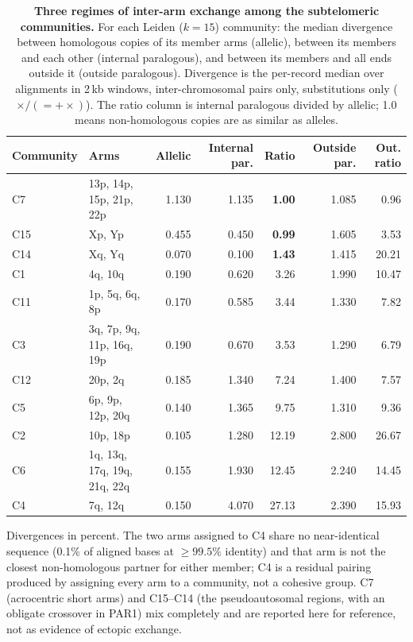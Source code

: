 
\begin{table}[h!]
\centering
\caption{\textbf{Three regimes of inter-arm exchange among the subtelomeric
communities.} For each Leiden ($k=15$) community: the median divergence between
homologous copies of its member arms (allelic), between its members and each
other (internal paralogous), and between its members and all ends outside it
(outside paralogous). Divergence is the per-record median over alignments in
2\,kb windows, inter-chromosomal pairs only, substitutions only
($\times/({=}+\times)$). The ratio column is internal paralogous divided by
allelic; 1.0 means non-homologous copies are as similar as alleles.}
\label{tab:community_tiers}
\small
\begin{tabular}{llrrrrr}
\hline
Community & Arms & Allelic & Internal par. & Ratio & Outside par. & Out. ratio \\
\hline
C7  & 13p, 14p, 15p, 21p, 22p          & 1.130 & 1.135 & \textbf{1.00} & 1.085 & 0.96 \\
C15 & Xp, Yp                           & 0.455 & 0.450 & \textbf{0.99} & 1.605 & 3.53 \\
C14 & Xq, Yq                           & 0.070 & 0.100 & \textbf{1.43} & 1.415 & 20.21 \\
C1  & 4q, 10q                          & 0.190 & 0.620 & 3.26 & 1.990 & 10.47 \\
C11 & 1p, 5q, 6q, 8p                   & 0.170 & 0.585 & 3.44 & 1.330 & 7.82 \\
C3  & 3q, 7p, 9q, 11p, 16q, 19p        & 0.190 & 0.670 & 3.53 & 1.290 & 6.79 \\
C12 & 20p, 2q                          & 0.185 & 1.340 & 7.24 & 1.400 & 7.57 \\
C5  & 6p, 9p, 12p, 20q                  & 0.140 & 1.365 & 9.75 & 1.310 & 9.36 \\
C2  & 10p, 18p                         & 0.105 & 1.280 & 12.19 & 2.800 & 26.67 \\
C6  & 1q, 13q, 17q, 19q, 21q, 22q      & 0.155 & 1.930 & 12.45 & 2.240 & 14.45 \\
C4  & 7q, 12q                          & 0.150 & 4.070 & 27.13 & 2.390 & 15.93 \\
\hline
\end{tabular}

\vspace{2pt}
{\footnotesize Divergences in percent. The two arms assigned to C4 share no
near-identical sequence (0.1\% of aligned bases at $\geq 99.5\%$ identity) and
that arm is not the closest non-homologous partner for either member; C4 is a
residual pairing produced by assigning every arm to a community, not a cohesive
group. C7 (acrocentric short arms) and C15--C14 (the pseudoautosomal regions,
with an obligate crossover in PAR1) mix completely and are reported here for
reference, not as evidence of ectopic exchange.}
\end{table}
